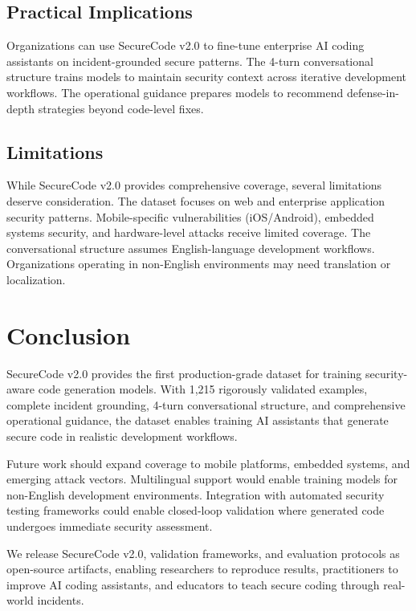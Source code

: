 \documentclass[11pt,letterpaper]{article}
\begin{document}
\subsection{Practical Implications}

Organizations can use SecureCode v2.0 to fine-tune enterprise AI coding assistants on incident-grounded secure patterns. The 4-turn conversational structure trains models to maintain security context across iterative development workflows. The operational guidance prepares models to recommend defense-in-depth strategies beyond code-level fixes.

\subsection{Limitations}

While SecureCode v2.0 provides comprehensive coverage, several limitations deserve consideration. The dataset focuses on web and enterprise application security patterns. Mobile-specific vulnerabilities (iOS/Android), embedded systems security, and hardware-level attacks receive limited coverage. The conversational structure assumes English-language development workflows. Organizations operating in non-English environments may need translation or localization.

\section{Conclusion}

SecureCode v2.0 provides the first production-grade dataset for training security-aware code generation models. With 1,215 rigorously validated examples, complete incident grounding, 4-turn conversational structure, and comprehensive operational guidance, the dataset enables training AI assistants that generate secure code in realistic development workflows.

Future work should expand coverage to mobile platforms, embedded systems, and emerging attack vectors. Multilingual support would enable training models for non-English development environments. Integration with automated security testing frameworks could enable closed-loop validation where generated code undergoes immediate security assessment.

We release SecureCode v2.0, validation frameworks, and evaluation protocols as open-source artifacts, enabling researchers to reproduce results, practitioners to improve AI coding assistants, and educators to teach secure coding through real-world incidents.
\end{document}
